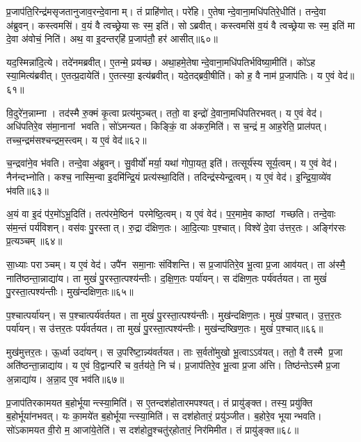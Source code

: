 प्र॒जाप॑ति॒रिन्द्र॑मसृजतानुजाव॒रन्दे॒वानाम्।
तं प्राहि॑णोत्।
परे॑हि।
ए॒तेषान्दे॒वाना॒मधि॑पतिरे॒धीति॑।
तन्दे॒वा अ॑ब्रुवन्।
कस्त्वमसि॑।
व॒यं वै त्वच्छ्रेयासः स्म॒ इति॑।
सोऽब्रवीत्।
कस्त्वमसि॑ व॒यं वै त्वच्छ्रेयासः स्म॒ इति॑ मा दे॒वा अ॑वोचं॒ निति॑।
अथ॒ वा इ॒दन्तर्‌हि॑ प्र॒जाप॑तौ॒ हर॑ आसीत्॥६०॥

यद॒स्मिन्ना॑दि॒त्ये।
तदे॑नमब्रवीत्।
ए॒तन्मे॒ प्रय॑च्छ।
अथा॒हमे॒तेषान्दे॒वाना॒मधि॑पतिर्भविष्या॒मीति॑।
को॑ऽह स्या॒मित्य॑ब्रवीत्।
ए॒तत्प्र॒दायेति॑।
ए॒तत्स्या॒ इत्य॑ब्रवीत्।
यदे॒तद्ब्रवी॒षीति॑।
को ह॒ वै नाम॑ प्र॒जाप॑तिः।
य ए॒वं वेद॑॥६१॥

वि॒दुरे॑न॒न्नाम्ना।
तद॑स्मै रु॒क्मं कृ॒त्वा प्रत्य॑मुञ्चत्।
ततो॒ वा इन्द्रो॑ दे॒वाना॒मधि॑पतिरभवत्।
य ए॒वं वेद॑।
अधि॑पतिरे॒व स॑मा॒नानां भवति।
सो॑ऽमन्यत।
किङ्किं॒ वा अ॑कर॒मिति॑।
स च॒न्द्रं म॒ आह॒रेति॒ प्राल॑पत्।
तच्च॒न्द्रम॑सश्चन्द्रम॒स्त्वम्।
य ए॒वं वेद॑॥६२॥

च॒न्द्रवा॑ने॒व भ॑वति।
तन्दे॒वा अ॑ब्रुवन्।
सु॒वीर्यो॑ मर्या॒ यथा॑ गोपा॒यत॒ इति॑।
तत्सूर्य॑स्य सूर्य॒त्वम्।
य ए॒वं वेद॑।
नैन॑न्दभ्नोति।
कश्च॒ नास्मि॒न्वा इ॒दमि॑न्द्रि॒यं प्रत्य॑स्था॒दिति॑।
तदिन्द्र॑स्येन्द्र॒त्वम्।
य ए॒वं वेद॑।
इ॒न्द्रि॒या॒व्ये॑व भ॑वति॥६३॥

अ॒यं वा इ॒दं प॑र॒मो॑ऽभू॒दिति॑।
तत्प॑रमे॒ष्ठिन॑ परमेष्ठि॒त्वम्।
य ए॒वं वेद॑।
प॒र॒मामे॒व काष्ठां गच्छति।
तन्दे॒वाः स॑म॒न्तं पर्य॑विशन्।
वस॑वः पु॒रस्तात्।
रु॒द्रा द॑क्षिण॒तः।
आ॒दि॒त्याः प॒श्चात्।
विश्वे॑ दे॒वा उ॑त्तर॒तः।
अङ्गि॑रसः प्र॒त्यञ्चम्॥६४॥

सा॒ध्याः पराञ्चम्।
य ए॒वं वेद॑।
उपै॑न समा॒नाः संवि॑शन्ति।
स प्र॒जाप॑तिरे॒व भू॒त्वा प्र॒जा आव॑यत्।
ता अ॑स्मै॒ नाति॑ष्ठन्ता॒न्नाद्या॑य।
ता मुखं॑ पु॒रस्ता॒त्पश्य॑न्तीः।
द॒क्षि॒ण॒तः पर्या॑यन्।
स द॑क्षिण॒तः पर्य॑वर्तयत।
ता मुखं॑ पु॒रस्ता॒त्पश्य॑न्तीः।
मुख॑न्दक्षिण॒तः॥६५॥

प॒श्चात्पर्या॑यन्।
स प॒श्चात्पर्य॑वर्तयत।
ता मुखं॑ पु॒रस्ता॒त्पश्य॑न्तीः।
मुख॑न्दक्षिण॒तः।
मुखं॑ प॒श्चात्।
उ॒त्त॒र॒तः पर्या॑यन्।
स उ॑त्तर॒तः पर्य॑वर्तयत।
ता मुखं॑ पु॒रस्ता॒त्पश्य॑न्तीः।
मुख॑न्दष्खिण॒तः।
मुखं॑ प॒श्चात्॥६६॥

मुख॑मुत्तर॒तः।
ऊ॒र्ध्वा उदा॑यन्।
स उ॒परि॑ष्टा॒न्न्य॑वर्तयत।
ताः स॒र्वतो॑मुखो भू॒त्वाऽऽव॑यत्।
ततो॒ वै तस्मै प्र॒जा अति॑ष्ठन्ता॒न्नाद्या॑य।
य ए॒वं वि॒द्वान्परि॑ च व॒र्तय॑ते॒ नि च॑।
प्र॒जाप॑तिरे॒व भू॒त्वा प्र॒जा अ॑त्ति।
तिष्ठ॑न्तेऽस्मै प्र॒जा अ॒न्नाद्या॑य।
अ॒न्ना॒द ए॒व भव॑ति॥६७॥\anuvakamend[आ॒सी॒द्वेद॑ चन्द्रम॒स्त्वं य ए॒वं वेदेन्द्रिया॒व्ये॑व भ॑वति प्र॒त्यञ्चं॒ मुख॑न्दक्षिण॒तो मुखं॑ प॒श्चान्नव॑ च]

प्र॒जाप॑तिरकामयत ब॒होर्भूयान्त्स्या॒मिति॑।
स ए॒तन्दश॑होतारमपश्यत्।
तं प्रायु॑ङ्क्त।
तस्य॒ प्रयु॑क्ति ब॒होर्भूया॑नभवत्।
यः का॒मये॑त ब॒होर्भूयान्त्स्या॒मिति॑।
स दश॑होतारं॒ प्रयु॑ञ्जीत।
ब॒होरे॒व भूयान्भवति।
सो॑ऽकामयत वी॒रो म॒ आजा॑ये॒तेति॑।
स दश॑होतु॒श्चतु॑र्‌होतारं॒ निर॑मिमीत।
तं प्रायु॑ङ्क्त॥६८॥

